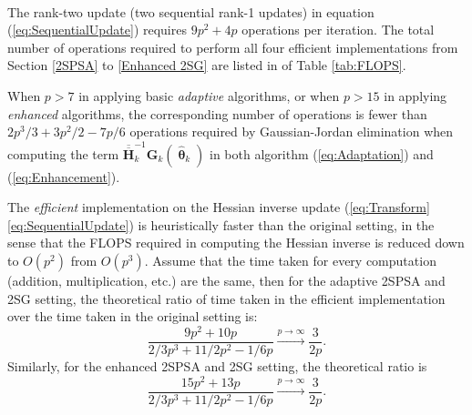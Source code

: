 \documentclass[conference]{IEEEtran}
\newcommand{\bG}{\bm{G}}
\newcommand{\ooH}{\bm{\overline{\overline{H}}}}
\newcommand{\htheta}{\bm{\hat{\uptheta}}}
\begin{document}
\begin{table} [!hbp] \centering 
	\\[5pt]
		\caption{FLOPS Required in Eq. (\ref{eq:Transform}\text{--}\ref{eq:SequentialUpdate})  }
		\label{tab:FLOPS}
	\end{table}

The rank-two update (two sequential rank-1 updates) in
equation (\ref{eq:SequentialUpdate}) requires $9p^2 + 4p$ operations
per iteration. The total number of operations required to perform all four
efficient implementations from Section \ref{2SPSA} to \ref{Enhanced
  2SG} are listed in of Table \ref{tab:FLOPS}.

When $p>7$ in
applying basic \textit{adaptive} algorithms, or when $p>15$ in applying \textit{enhanced} algorithms, the corresponding number
of operations is fewer than $2p^3/3+3p^2/2-7p/6$ operations required
by Gaussian-Jordan elimination when computing the term $\ooH_k^{-1}
\bG_k(\htheta_k)$ in both algorithm (\ref{eq:Adaptation}) and
(\ref{eq:Enhancement}).

The \textit{efficient} implementation on the Hessian inverse update (\ref{eq:Transform}\text{--}\ref{eq:SequentialUpdate}) is heuristically faster than the original setting, in the sense that the FLOPS required in computing the Hessian inverse is reduced down to $O(p^2)$ from $O(p^3)$. Assume that the time taken for every computation (addition, multiplication, etc.) are the same, then for the adaptive 2SPSA and 2SG setting, the theoretical ratio of time taken in the efficient implementation over the time taken in the original setting is:
\begin{equation*}
\frac{9p^2+10p}{2/3p^3+11/2p^2-1/6p} \overset{p \to \infty}{\longrightarrow} \frac{3}{2p}.
\end{equation*}
Similarly, for the enhanced 2SPSA and 2SG setting, the theoretical ratio is
\begin{equation*}
\frac{15p^2+13p}{2/3p^3+11/2p^2-1/6p} \overset{p \to \infty}{\longrightarrow} \frac{3}{2p}.
\end{equation*}
\end{document}
